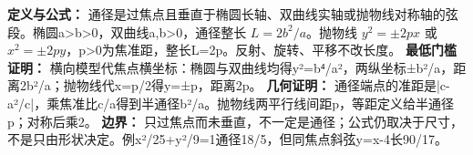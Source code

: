 \textbf{定义与公式：} 通径是过焦点且垂直于椭圆长轴、双曲线实轴或抛物线对称轴的弦段。椭圆a>b>0，双曲线a,b>0，通径整长 $L=2b^2/a$。抛物线 $y^2=\pm2px$ 或 $x^2=\pm2py$，p>0为焦准距，整长L=2p。反射、旋转、平移不改长度。
\textbf{最低门槛证明：} 横向模型代焦点横坐标：椭圆与双曲线均得y²=b⁴/a²，两纵坐标±b²/a，距离2b²/a；抛物线代x=p/2得y=±p，距离2p。
\textbf{几何证明：} 通径端点的准距是|c-a²/c|，乘焦准比c/a得到半通径b²/a。抛物线两平行线间距p，等距定义给半通径p；对称后乘2。
\textbf{边界：} 只过焦点而未垂直，不一定是通径；公式仍取决于尺寸，不是只由形状决定。例x²/25+y²/9=1通径18/5，但同焦点斜弦y=x-4长90/17。
